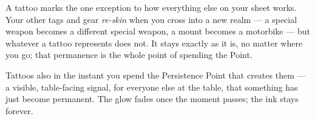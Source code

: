 A tattoo marks the one exception to how everything else on your sheet
works. Your other tags and gear \emph{re-skin} when you cross into a new
realm --- a special weapon becomes a different special weapon, a mount
becomes a motorbike --- but whatever a tattoo represents does not. It
stays exactly as it is, no matter where you go; that permanence is the
whole point of spending the Point.

Tattoos also  in the instant you spend the Persistence
Point that creates them --- a visible, table-facing signal, for everyone
else at the table, that something has just become permanent. The glow
fades once the moment passes; the ink stays forever.

